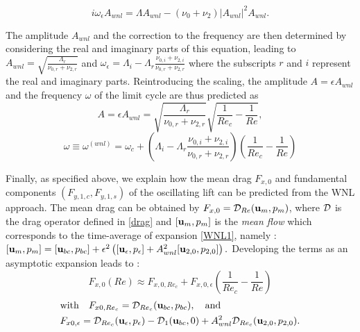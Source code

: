 \documentclass[twocolumn,10pt]{asme2ej}
\newcommand{\be}[1]{ \begin{equation} \label{#1}}
\newcommand{\ee}{\end{equation}}
\begin{document}
\be{WNL3}
i \omega_\epsilon A_{wnl} = \Lambda A_{wnl} - (\nu_0+\nu_2)  |A_{wnl}|^2 A_{wnl}.
\ee


The amplitude $A_{wnl}$ and the correction to the frequency are then determined by considering the real and imaginary parts of this equation, leading to
$
A_{wnl}= \sqrt{ \frac{\Lambda_r}{\nu_{0,r}+\nu_{2,r}}}
$ and
$
\omega_\epsilon = \Lambda_i- \Lambda_r \frac{\nu_{0,i}+\nu_{2,i}}{\nu_{0,r}+\nu_{2,r}} 
$
where the subscripts $r$ and $i$ represent the real and imaginary parts.
Reintroducing the scaling, the  amplitude $A =  \epsilon A_{wnl} $ and the frequency $\omega$ of the limit cycle are thus predicted as
\be{ANL} 
A =  \epsilon A_{wnl} =\sqrt{ \frac{\Lambda_r}{\nu_{0,r}+\nu_{2,r} }} \sqrt{\frac{1}{Re_c}-\frac{1}{Re}},
\ee
\be{omegaWNL} 
\omega \equiv \omega^{(wnl)} =\omega_c+ \left( \Lambda_i- \Lambda_r \frac{\nu_{0,i}+\nu_{2,i}}{\nu_{0,r}+\nu_{2,r}} \right) \left(\frac{1}{Re_c}-\frac{1}{Re}\right)
\ee 


Finally, as specified above, we explain how the mean drag $F_{x,0}$ and fundamental components $(F_{y,1,c},F_{y,1,s})$ of the oscillating lift can be predicted from the WNL approach.
The mean drag  can be obtained by $F_{x,0} = {\cal D}_{Re}({\bf u}_m,p_m)$, where ${\cal D}$ is the drag operator defined in \ref{drag} and 
$[{\bf u}_m,p_m]$ is the {\em mean flow}  
which corresponds to the time-average of expansion  \ref{WNL1}, namely :
$
[{\bf u}_m,p_m] = [{\bf u}_{bc},p_{bc}] +\epsilon^2 \left( [{\bf u}_\epsilon,p_\epsilon] + A_{wnl}^2 [{\bf u}_{2,0}, p_{2,0} ] \right).
$
Developing the terms as an asymptotic expansion leads to :
\be{drag_cos}
 F_{x,0}(Re) \approx F_{x,0,{Re_c}} +  F_{x,0,\epsilon} \left(\frac{1}{Re_c}-\frac{1}{Re}\right)
\ee 
\begin{equation*}
\begin{aligned}
& \mbox{with} \quad F_{x0,{Re_c}}  = {\cal D}_{Re_c} ({\bf u}_{bc},p_{bc}), \quad \mbox{and}  
\\ 
& F_{x0,\epsilon} = {\cal D}_{Re_c} ({\bf u}_\epsilon, p_\epsilon ) - {\cal D}_{1} ({\bf u}_{bc},0) 
+ A_{wnl}^2 {\cal D}_{Re_c} ({\bf u}_{2,0},p_{2,0}). 
\end{aligned}
\end{equation*}
\end{document}
